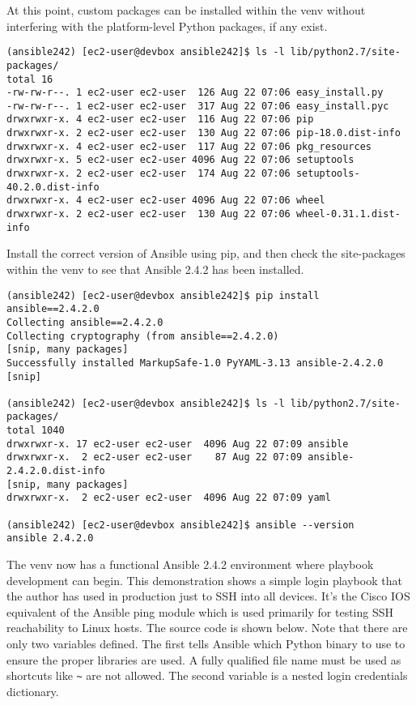 At this point, custom packages can be installed within the venv without
interfering with the platform-level Python packages, if any exist.

\begin{verbatim}
(ansible242) [ec2-user@devbox ansible242]$ ls -l lib/python2.7/site-packages/
total 16
-rw-rw-r--. 1 ec2-user ec2-user  126 Aug 22 07:06 easy_install.py
-rw-rw-r--. 1 ec2-user ec2-user  317 Aug 22 07:06 easy_install.pyc
drwxrwxr-x. 4 ec2-user ec2-user  116 Aug 22 07:06 pip
drwxrwxr-x. 2 ec2-user ec2-user  130 Aug 22 07:06 pip-18.0.dist-info
drwxrwxr-x. 4 ec2-user ec2-user  117 Aug 22 07:06 pkg_resources
drwxrwxr-x. 5 ec2-user ec2-user 4096 Aug 22 07:06 setuptools
drwxrwxr-x. 2 ec2-user ec2-user  174 Aug 22 07:06 setuptools-40.2.0.dist-info
drwxrwxr-x. 4 ec2-user ec2-user 4096 Aug 22 07:06 wheel
drwxrwxr-x. 2 ec2-user ec2-user  130 Aug 22 07:06 wheel-0.31.1.dist-info
\end{verbatim}

Install the correct version of Ansible using pip, and then check the
site-packages within the venv to see that Ansible 2.4.2 has been installed.

\begin{verbatim}
(ansible242) [ec2-user@devbox ansible242]$ pip install ansible==2.4.2.0
Collecting ansible==2.4.2.0
Collecting cryptography (from ansible==2.4.2.0)
[snip, many packages]
Successfully installed MarkupSafe-1.0 PyYAML-3.13 ansible-2.4.2.0 [snip]

(ansible242) [ec2-user@devbox ansible242]$ ls -l lib/python2.7/site-packages/
total 1040
drwxrwxr-x. 17 ec2-user ec2-user  4096 Aug 22 07:09 ansible
drwxrwxr-x.  2 ec2-user ec2-user    87 Aug 22 07:09 ansible-2.4.2.0.dist-info
[snip, many packages]
drwxrwxr-x.  2 ec2-user ec2-user  4096 Aug 22 07:09 yaml

(ansible242) [ec2-user@devbox ansible242]$ ansible --version
ansible 2.4.2.0
\end{verbatim}

The venv now has a functional Ansible 2.4.2 environment where playbook
development can begin. This demonstration shows a simple login playbook that
the author has used in production just to SSH into all devices. It's the Cisco
IOS equivalent of the Ansible ping module which is used primarily for testing
SSH reachability to Linux hosts. The source code is shown below. Note that
there are only two variables defined. The first tells Ansible which Python
binary to use to ensure the proper libraries are used. A fully qualified file
name must be used as shortcuts like \verb|~| are not allowed. The second
variable is a nested login credentials dictionary.

